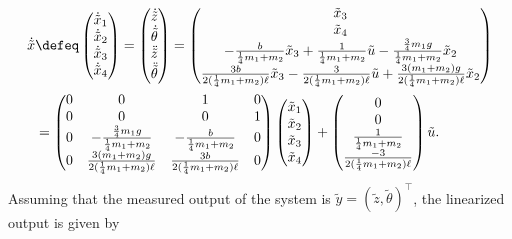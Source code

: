\begin{align*}
\dot{\tilde{x}} &\defeq \begin{pmatrix} \dot{\tilde{x}}_1 \\ \dot{\tilde{x}}_2 \\ \dot{\tilde{x}}_3 \\ \dot{\tilde{x}}_4\end{pmatrix} = \begin{pmatrix}\dot{\tilde{z}} \\ \dot{\tilde{\theta}} \\ \ddot{\tilde{z}} \\ \ddot{\tilde{\theta}}\end{pmatrix} 
= \begin{pmatrix} \tilde{x}_3 \\ \tilde{x}_4 \\  
-\frac{b}{\frac{1}{4}m_1 + m_2}\tilde{x}_3 + \frac{1}{\frac{1}{4}m_1 + m_2}\tilde{u} - \frac{\frac{3}{4} m_1g}{\frac{1}{4}m_1 + m_2}\tilde{x}_2 \\ 
\frac{3b}{2(\frac{1}{4}m_1 + m_2)\ell}\tilde{x}_3 - \frac{3}{2(\frac{1}{4}m_1 + m_2)\ell}\tilde{u} + \frac{3 (m_1+m_2)g}{2 (\frac{1}{4}m_1 + m_2)\ell} \tilde{x}_2 \end{pmatrix} \\
&= \begin{pmatrix} 0 & 0 & 1 & 0 \\ 0 & 0 & 0 & 1 \\ 0 & -\frac{\frac{3}{4} m_1g}{\frac{1}{4}m_1 + m_2} & -\frac{b}{\frac{1}{4}m_1 + m_2} & 0 \\ 0 & \frac{3 (m_1+m_2)g}{2 (\frac{1}{4}m_1 + m_2)\ell} & \frac{3b}{2(\frac{1}{4}m_1 + m_2)\ell} & 0 \end{pmatrix} \begin{pmatrix} \tilde{x}_1 \\ \tilde{x}_2 \\ \tilde{x}_3 \\ \tilde{x}_4 \end{pmatrix} + \begin{pmatrix} 0 \\ 0 \\ \frac{1}{\frac{1}{4}m_1 + m_2} \\  \frac{-3}{2(\frac{1}{4}m_1 + m_2)\ell} \end{pmatrix} \tilde{u}.
\end{align*}
Assuming that the measured output of the system is $\tilde{y}=(\tilde{z},\tilde{\theta})^\top$, the linearized output is given by

